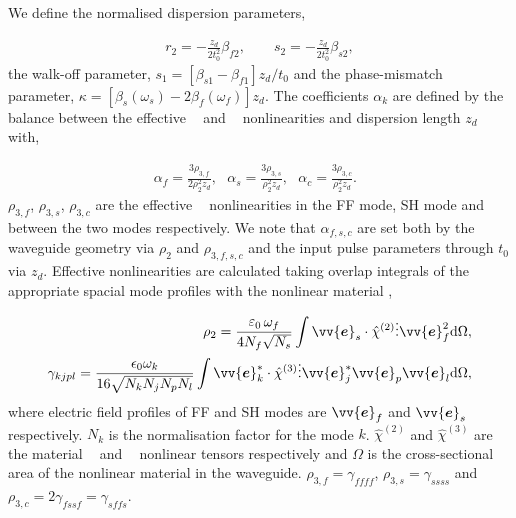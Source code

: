 \documentclass[reprint,
 amsmath,amssymb,
 pra,
]{revtex4-1}
\newcommand{\eq}[1]{
\begin{equation}\begin{aligned}
#1
\end{aligned}\end{equation}}
\DeclareMathOperator{\chitwo}{ {\chi}^{(2)} }
\DeclareMathOperator{\chithree}{ {\chi}^{(3)} }
\DeclareMathOperator{\eps}{\varepsilon}
\begin{document}
We define the normalised dispersion parameters,
\eq{
r_2 = -\frac{z_d}{2 t_0^2}\beta_{f2}, \qquad
s_2 = -\frac{z_d}{2 t_0^2}\beta_{s2},
}
 the walk-off parameter, $s_1 = [\beta_{s1} - \beta_{f1}] z_d/t_0$ and the phase-mismatch parameter, $\kappa = [\beta_s(\omega_s) - 2 \beta_f(\omega_f)] z_d$.
The coefficients $\alpha_k$ are defined by the balance between the effective $\chithree$ and $\chitwo$ nonlinearities and dispersion length $z_d$ with,
\eq{
\alpha_f = \frac{3\rho_{3,f}}{2\rho_2^2 z_d}, \,\,\,\,
\alpha_s = \frac{3\rho_{3,s}}{\rho_2^2 z_d},  \,\,\,\,
\alpha_c = \frac{3\rho_{3,c}}{\rho_2^2 z_d}.  \,\,\,\,
}
$\rho_{3,f}$, $\rho_{3,s}$, $\rho_{3,c}$ are the effective $\chithree$ nonlinearities in the FF mode, SH mode and between the two modes respectively. We note that $\alpha_{f,s,c}$ are set both by the waveguide geometry via $\rho_2$ and $\rho_{3,f,s,c}$ and the input pulse parameters through $t_0$ via $z_d$. Effective nonlinearities are calculated taking overlap integrals of the appropriate spacial mode profiles with the nonlinear material \cite{Cai2018HighlyNano-waveguides, Gorbach2016PerturbationGeneration},
\eq{
\rho_2 = \frac{ \eps_0 \omega_f}{4 N_f\sqrt{N_{s}}}\int \vv{\bm{e}}_{s} \cdot  \hat{\chi}^{(2)} \vdots \vv{\bm{e}}_f^2  \mathrm{d}\Omega,\\
\gamma_{kjpl} = \frac{\epsilon_0 \omega_k}{16\sqrt{N_kN_jN_pN_l} } \int \vv{\bm{e}}^*_k \cdot \hat{\chi}^{(3)} \vdots \vv{\bm{e}}_j^* \vv{\bm{e}}_p \vv{\bm{e}}_l   \dd \Omega,
}
where electric field profiles of FF and SH modes are ${\vv{\bm{e}}}_{f}$ and ${\vv{\bm{e}}}_{s}$ respectively. $N_k$ is the normalisation factor for the mode $k$. $\hat{\chi}^{(2)}$ and $\hat{\chi}^{(3)}$ are the material $\chitwo$ and $\chithree$ nonlinear tensors respectively and $\Omega$ is the cross-sectional area of the nonlinear material in the waveguide. $\rho_{3,f} = \gamma_{ffff}$, $\rho_{3,s} = \gamma_{ssss}$ and $\rho_{3,c} = 2\gamma_{fssf} = \gamma_{sffs}$. 
\end{document}
